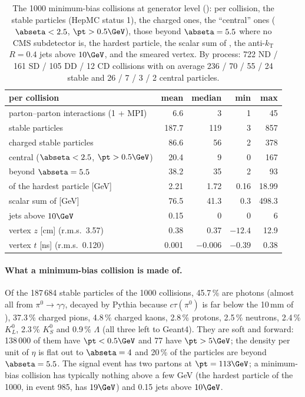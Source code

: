 \begin{table}[htbp]
\centering\small
\caption{The 1000 minimum-bias collisions at generator level (): per collision,
the stable particles (HepMC status 1), the charged ones, the ``central'' ones ($\abseta<2.5$,
$\pt>0.5\GeV$), those beyond $\abseta=5.5$ where no CMS subdetector is, the hardest particle, the scalar
sum of \pt{}, the anti-$k_{\mathrm{T}}$ $R=0.4$ jets above $10\GeV$, and the smeared vertex. By process:
722 ND / 161 SD / 105 DD / 12 CD collisions with on average 236 / 70 / 55 / 24 stable and 26 / 7 / 3 / 2
central particles.}
\label{tab:cat}
\begin{tabular}{lrrrr}
\toprule
per collision & mean & median & min & max \\
\midrule
parton--parton interactions (1 + MPI) & 6.6 & 3 & 1 & 45 \\
stable particles & 187.7 & 119 & 3 & 857 \\
charged stable particles & 86.6 & 56 & 2 & 378 \\
central ($\abseta<2.5$, $\pt>0.5\GeV$) & 20.4 & 9 & 0 & 167 \\
beyond $\abseta=5.5$ & 38.2 & 35 & 2 & 93 \\
\pt{} of the hardest particle [GeV] & 2.21 & 1.72 & 0.16 & 18.99 \\
scalar sum of \pt{} [GeV] & 76.5 & 41.3 & 0.3 & 498.3 \\
jets above $10\GeV$ & 0.15 & 0 & 0 & 6 \\
vertex $z$ [cm] (r.m.s.\ 3.57) & 0.38 & 0.37 & $-12.4$ & 12.9 \\
vertex $t$ [ns] (r.m.s.\ 0.120) & 0.001 & $-0.006$ & $-0.39$ & 0.38 \\
\bottomrule
\end{tabular}
\end{table}

\paragraph{What a minimum-bias collision is made of.} Of the 187\,684 stable particles of the 1000
collisions, 45.7\,\% are photons (almost all from $\pi^0\to\gamma\gamma$, decayed by Pythia because
$c\tau(\pi^0)$ is far below the 10\,mm of ), 37.3\,\% charged pions,
4.8\,\% charged kaons, 2.8\,\% protons, 2.5\,\% neutrons, 2.4\,\% $K^0_L$, 2.3\,\% $K^0_S$ and 0.9\,\%
$\Lambda$ (all three left to Geant4). They are soft and forward: 138\,000 of them have $\pt<0.5\GeV$ and 77 have
$\pt>5\GeV$; the density per unit of $\eta$ is flat out to $\abseta=4$ and 20\,\% of the particles are
beyond $\abseta=5.5$. The signal event has two partons at $\pt=113\GeV$; a minimum-bias collision has
typically nothing above a few GeV (the hardest particle of the 1000, in event 985, has $19\GeV$) and 0.15 jets
above $10\GeV$.

